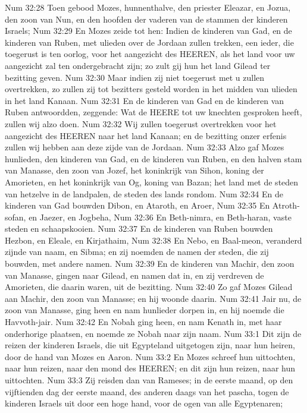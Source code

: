 Num 32:28  Toen gebood Mozes, hunnenthalve, den priester Eleazar, en Jozua, den zoon van Nun, en den hoofden der vaderen van de stammen der kinderen Israels;
Num 32:29  En Mozes zeide tot hen: Indien de kinderen van Gad, en de kinderen van Ruben, met ulieden over de Jordaan zullen trekken, een ieder, die toegerust is ten oorlog, voor het aangezicht des HEEREN, als het land voor uw aangezicht zal ten ondergebracht zijn; zo zult gij hun het land Gilead ter bezitting geven.
Num 32:30  Maar indien zij niet toegerust met u zullen overtrekken, zo zullen zij tot bezitters gesteld worden in het midden van ulieden in het land Kanaan.
Num 32:31  En de kinderen van Gad en de kinderen van Ruben antwoordden, zeggende: Wat de HEERE tot uw knechten gesproken heeft, zullen wij alzo doen.
Num 32:32  Wij zullen toegerust overtrekken voor het aangezicht des HEEREN naar het land Kanaan; en de bezitting onzer erfenis zullen wij hebben aan deze zijde van de Jordaan.
Num 32:33  Alzo gaf Mozes hunlieden, den kinderen van Gad, en de kinderen van Ruben, en den halven stam van Manasse, den zoon van Jozef, het koninkrijk van Sihon, koning der Amorieten, en het koninkrijk van Og, koning van Bazan; het land met de steden van hetzelve in de landpalen, de steden des lands rondom.
Num 32:34  En de kinderen van Gad bouwden Dibon, en Ataroth, en Aroer,
Num 32:35  En Atroth-sofan, en Jaezer, en Jogbeha,
Num 32:36  En Beth-nimra, en Beth-haran, vaste steden en schaapskooien.
Num 32:37  En de kinderen van Ruben bouwden Hezbon, en Eleale, en Kirjathaim,
Num 32:38  En Nebo, en Baal-meon, veranderd zijnde van naam, en Sibma; en zij noemden de namen der steden, die zij bouwden, met andere namen.
Num 32:39  En de kinderen van Machir, den zoon van Manasse, gingen naar Gilead, en namen dat in, en zij verdreven de Amorieten, die daarin waren, uit de bezitting.
Num 32:40  Zo gaf Mozes Gilead aan Machir, den zoon van Manasse; en hij woonde daarin.
Num 32:41  Jair nu, de zoon van Manasse, ging heen en nam hunlieder dorpen in, en hij noemde die Havvoth-jair.
Num 32:42  En Nobah ging heen, en nam Kenath in, met haar onderhorige plaatsen, en noemde ze Nobah naar zijn naam.
Num 33:1  Dit zijn de reizen der kinderen Israels, die uit Egypteland uitgetogen zijn, naar hun heiren, door de hand van Mozes en Aaron.
Num 33:2  En Mozes schreef hun uittochten, naar hun reizen, naar den mond des HEEREN; en dit zijn hun reizen, naar hun uittochten.
Num 33:3  Zij reisden dan van Rameses; in de eerste maand, op den vijftienden dag der eerste maand, des anderen daags van het pascha, togen de kinderen Israels uit door een hoge hand, voor de ogen van alle Egyptenaren;

